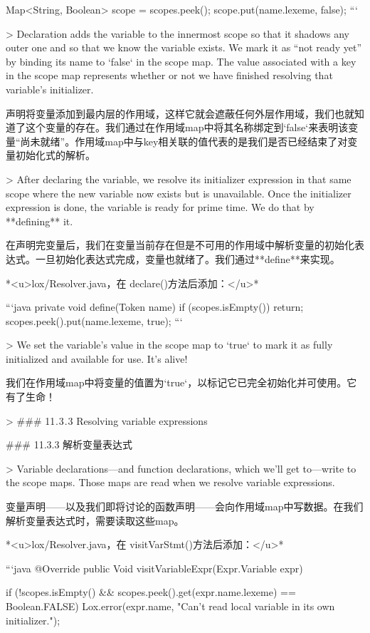 \documentclass[cn,11pt,chinese]{elegantbook}
\begin{document}
{{{{{{{{{{{{{{    Map<String, Boolean> scope = scopes.peek();
    scope.put(name.lexeme, false);
  }
```

> Declaration adds the variable to the innermost scope so that it shadows any outer one and so that we know the variable exists. We mark it as “not ready yet” by binding its name to `false` in the scope map. The value associated with a key in the scope map represents whether or not we have finished resolving that variable’s initializer.

声明将变量添加到最内层的作用域，这样它就会遮蔽任何外层作用域，我们也就知道了这个变量的存在。我们通过在作用域map中将其名称绑定到`false`来表明该变量“尚未就绪”。作用域map中与key相关联的值代表的是我们是否已经结束了对变量初始化式的解析。

> After declaring the variable, we resolve its initializer expression in that same scope where the new variable now exists but is unavailable. Once the initializer expression is done, the variable is ready for prime time. We do that by **defining** it.

在声明完变量后，我们在变量当前存在但是不可用的作用域中解析变量的初始化表达式。一旦初始化表达式完成，变量也就绪了。我们通过**define**来实现。

*<u>lox/Resolver.java，在 declare()方法后添加：</u>*

```java
  private void define(Token name) {
    if (scopes.isEmpty()) return;
    scopes.peek().put(name.lexeme, true);
  }
```

> We set the variable’s value in the scope map to `true` to mark it as fully initialized and available for use. It’s alive!

我们在作用域map中将变量的值置为`true`，以标记它已完全初始化并可使用。它有了生命！

> ### 11 . 3 . 3 Resolving variable expressions

### 11.3.3 解析变量表达式

> Variable declarations—and function declarations, which we’ll get to—write to the scope maps. Those maps are read when we resolve variable expressions.

变量声明——以及我们即将讨论的函数声明——会向作用域map中写数据。在我们解析变量表达式时，需要读取这些map。

*<u>lox/Resolver.java，在 visitVarStmt()方法后添加：</u>*

```java
  @Override
  public Void visitVariableExpr(Expr.Variable expr) {
    if (!scopes.isEmpty() &&
        scopes.peek().get(expr.name.lexeme) == Boolean.FALSE) {
      Lox.error(expr.name,
          "Can't read local variable in its own initializer.");
    }

}}}}}}}}}}}}}}
\end{document}

